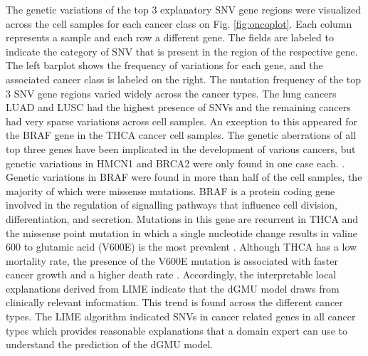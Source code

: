 
The genetic variations of the top 3 explanatory SNV gene regions were visualized across the cell samples for each cancer class on Fig. \ref{fig:oncoplot}. Each column represents a sample and each row a different gene. The fields are labeled to indicate the category of SNV that is present in the region of the respective gene. The left barplot shows the frequency of variations for each gene, and the associated cancer class is labeled on the right. The mutation frequency of the top 3 SNV gene regions varied widely across the cancer types. The lung cancers LUAD and LUSC had the highest presence of SNVs and the remaining cancers had very sparse variations across cell samples. An exception to this appeared for the BRAF gene in the THCA cancer cell samples. The genetic aberrations of all top three genes have been implicated in the development of various cancers, but genetic variations in HMCN1 and BRCA2 were only found in one case each. \cite{mersch2015cancers,kikutake2018intratumor,kebebew2007prevalence}. Genetic variations in BRAF were found in more than half of the cell samples, the majority of which were missense mutations. BRAF is a protein coding gene involved in the regulation of signalling pathways that influence cell division, differentiation, and secretion. Mutations in this gene are recurrent in THCA and the missense point mutation in which a single nucleotide change results in valine 600 to glutamic acid (V600E) is the most prevalent \cite{xing2013association}. Although THCA has a low mortality rate, the presence of the V600E mutation is associated with faster cancer growth and a higher death rate \cite{xing2013association}. Accordingly, the interpretable local explanations derived from LIME indicate that the dGMU model draws from clinically relevant information. This trend is found across the different cancer types. The LIME algorithm indicated SNVs in cancer related genes in all cancer types which provides reasonable explanations that a domain expert can use to understand the prediction of the dGMU model. 
